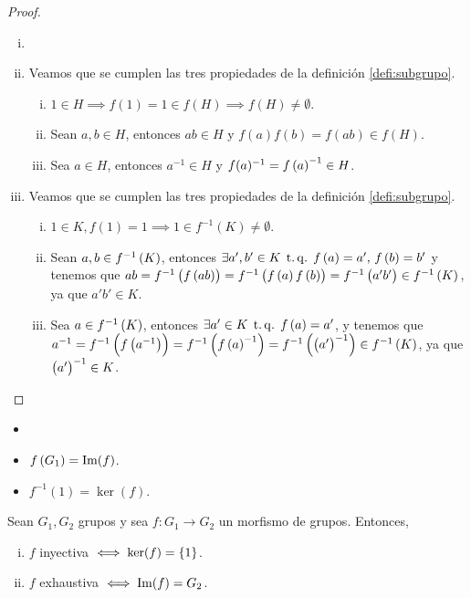 \begin{proof}
    \begin{enumerate}[i)]
        \item[]
        \item Veamos que se cumplen las tres propiedades de la definición \ref{defi:subgrupo}.
        \begin{enumerate}[i)]
            \item $1 \in H \implies f(1) = 1 \in f(H) \implies f(H) \neq \emptyset$.
            \item Sean $a, b \in H$, entonces $ab \in H$ y $f(a) f(b) = f(ab) \in f(H)$.
            \item Sea $a \in H$, entonces $a^{-1} \in H$ y $f(a)^{-1} = f\left( a\right) ^{-1} \in H$.
        \end{enumerate}
        \item Veamos que se cumplen las tres propiedades de la definición \ref{defi:subgrupo}.
        \begin{enumerate}[i)]
            \item $1 \in K, f(1) = 1 \implies 1 \in f^{-1}(K) \neq \emptyset$.
            \item Sean $a, b \in f^{-1}\left( K\right)$, entonces $\exists a', b' \in K \operatorname{\;t.q.\;} f\left( a\right) = a', \, f\left( b\right) = b'$ y tenemos que $ab = f^{-1}\left( f\left( ab\right) \right) = f^{-1}\left( f\left( a \right) f\left( b\right)\right) = f^{-1}\left( a'b'\right) \in f^{-1}\left( K\right)$, ya que $a'b' \in K$.
            \item Sea $a \in f^{-1}\left( K\right)$, entonces $\exists a' \in K \operatorname{\;t.q.\;} f\left( a \right) = a'$, y tenemos que $a^{-1} = f^{-1}\left( f\left( a^{-1}\right) \right) = f^{-1}\left( f\left( a \right) ^{-1} \right) = f^{-1}\left( \left( a'\right)^{-1}\right) \in f^{-1}\left( K\right)$, ya que $\left( a'\right)^{-1} \in K$.
        \end{enumerate}
    \end{enumerate}
\end{proof}

\begin{obs}
    \begin{itemize}
        \item[]
        \item $f\left( G_1 \right) = \operatorname{Im}(f)$.
        \item $f^{-1}(1) = \ker(f)$.
    \end{itemize}
\end{obs}

\begin{prop} Sean $G_1, G_2$ grupos y sea $f\colon G_1\to G_2$ un morfismo de grupos. Entonces,
    \begin{enumerate}[i)]
        \item $f$ inyectiva $\iff \ker(f) = \left\{1\right\}$.
        \item $f$ exhaustiva $\iff \operatorname{Im}(f) = G_2$.
    \end{enumerate}
\end{prop}

